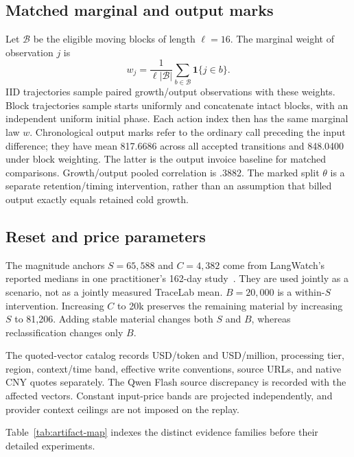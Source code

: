 \documentclass[sigconf,screen,nonacm]{acmart}
\newcommand{\ind}{\mathbf{1}}
\begin{document}
\subsection{Matched marginal and output marks}
Let $\mathcal B$ be the eligible moving blocks of length $\ell=16$. The
marginal weight of observation $j$ is
\begin{equation}
w_j=\frac{1}{\ell|\mathcal B|}\sum_{b\in\mathcal B}\ind\{j\in b\}.
\end{equation}
IID trajectories sample paired growth/output observations with these weights.
Block trajectories sample starts uniformly and concatenate intact blocks,
with an independent uniform initial phase. Each action index then has the
same marginal law $w$. Chronological output marks refer to the ordinary
call preceding the input difference; they have mean 817.6686 across all
accepted transitions and 848.0400 under block weighting. The latter is the
output invoice baseline for matched comparisons. Growth/output pooled
correlation is .3882. The marked split $\theta$ is a separate retention/timing
intervention, rather than an assumption that billed output exactly equals
retained cold growth.

\subsection{Reset and price parameters}
The magnitude anchors $S=65,588$ and $C=4,382$ come from LangWatch's reported
medians in one practitioner's 162-day study~\cite{langwatch}. They are used
jointly as a scenario, not as a jointly measured TraceLab mean. $B=20,000$
is a within-$S$ intervention. Increasing $C$ to 20k preserves the remaining
material by increasing $S$ to 81,206. Adding stable material changes both
$S$ and $B$, whereas reclassification changes only $B$.

The quoted-vector catalog records USD/token and USD/million, processing tier,
region, context/time band, effective write conventions, source URLs, and
native CNY quotes separately. The Qwen Flash source discrepancy is recorded
with the affected vectors. Constant input-price bands are projected
independently, and provider context ceilings are not imposed on the replay.

Table~\ref{tab:artifact-map} indexes the distinct evidence families before their detailed experiments.
\end{document}
